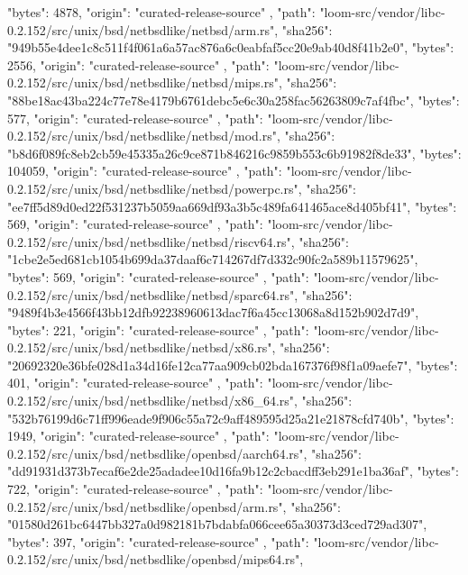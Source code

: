 {{      "bytes": 4878,
      "origin": "curated-release-source"
    },
    {
      "path": "loom-src/vendor/libc-0.2.152/src/unix/bsd/netbsdlike/netbsd/arm.rs",
      "sha256": "949b55e4dee1c8c511f4f061a6a57ac876a6c0eabfaf5cc20e9ab40d8f41b2e0",
      "bytes": 2556,
      "origin": "curated-release-source"
    },
    {
      "path": "loom-src/vendor/libc-0.2.152/src/unix/bsd/netbsdlike/netbsd/mips.rs",
      "sha256": "88be18ac43ba224c77e78e4179b6761debc5e6c30a258fac56263809c7af4fbc",
      "bytes": 577,
      "origin": "curated-release-source"
    },
    {
      "path": "loom-src/vendor/libc-0.2.152/src/unix/bsd/netbsdlike/netbsd/mod.rs",
      "sha256": "b8d6f089fc8eb2cb59e45335a26c9ce871b846216c9859b553c6b91982f8de33",
      "bytes": 104059,
      "origin": "curated-release-source"
    },
    {
      "path": "loom-src/vendor/libc-0.2.152/src/unix/bsd/netbsdlike/netbsd/powerpc.rs",
      "sha256": "ee7ff5d89d0ed22f531237b5059aa669df93a3b5c489fa641465ace8d405bf41",
      "bytes": 569,
      "origin": "curated-release-source"
    },
    {
      "path": "loom-src/vendor/libc-0.2.152/src/unix/bsd/netbsdlike/netbsd/riscv64.rs",
      "sha256": "1cbe2e5ed681cb1054b699da37daaf6c714267df7d332c90fc2a589b11579625",
      "bytes": 569,
      "origin": "curated-release-source"
    },
    {
      "path": "loom-src/vendor/libc-0.2.152/src/unix/bsd/netbsdlike/netbsd/sparc64.rs",
      "sha256": "9489f4b3e4566f43bb12dfb92238960613dac7f6a45cc13068a8d152b902d7d9",
      "bytes": 221,
      "origin": "curated-release-source"
    },
    {
      "path": "loom-src/vendor/libc-0.2.152/src/unix/bsd/netbsdlike/netbsd/x86.rs",
      "sha256": "20692320e36bfe028d1a34d16fe12ca77aa909cb02bda167376f98f1a09aefe7",
      "bytes": 401,
      "origin": "curated-release-source"
    },
    {
      "path": "loom-src/vendor/libc-0.2.152/src/unix/bsd/netbsdlike/netbsd/x86_64.rs",
      "sha256": "532b76199d6c71ff996eade9f906c55a72c9aff489595d25a21e21878cfd740b",
      "bytes": 1949,
      "origin": "curated-release-source"
    },
    {
      "path": "loom-src/vendor/libc-0.2.152/src/unix/bsd/netbsdlike/openbsd/aarch64.rs",
      "sha256": "dd91931d373b7ecaf6e2de25adadee10d16fa9b12c2cbacdff3eb291e1ba36af",
      "bytes": 722,
      "origin": "curated-release-source"
    },
    {
      "path": "loom-src/vendor/libc-0.2.152/src/unix/bsd/netbsdlike/openbsd/arm.rs",
      "sha256": "01580d261bc6447bb327a0d982181b7bdabfa066cee65a30373d3ced729ad307",
      "bytes": 397,
      "origin": "curated-release-source"
    },
    {
      "path": "loom-src/vendor/libc-0.2.152/src/unix/bsd/netbsdlike/openbsd/mips64.rs",
}}
